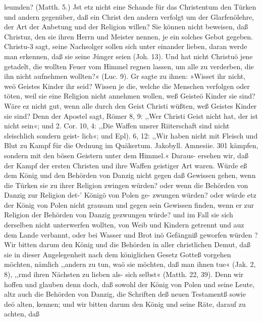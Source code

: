 {    leumden? (Matth. 5.)
    Jst etz nicht eine Schande für das Christentum den Türken
    und andern gegenüber, daß ein Christ den andern verfolgt um
    der Glarfenölehre, der Art der Anbetung und der Religion
    willen? Sie können nicht beweisen, daß Christuz, den sie ihren
    Herrn und Meister nennen, je ein solches Gebot gegeben. Christu-3
    sagt, seine Nachsolger sollen sich unter einander lieben, daran
    werde man erkennen, daß sie seine Jünger seien (Joh. 13). Und
    hat nicht Christuö jene getadelt, die wollten Feuer vom Himmel
    regnen lassen, um alle zu verderben, die ihn nicht aufnehmen
    wollten?« (Luc. 9). Gr sagte zu ihnen: »Wisset ihr nicht, weö
    Geistes Kinder ihr seid? Wissen je die, welche die Menschen
    verfolgen oder töten, weil sie eine Religion nicht annehmen
    wollen, weß Geisteö Kinder sie sind? Wäre ez nicht gut,
    wenn alle durch den Geist Christi wüßten, weß Geistes
    Kinder sie sind? Denn der Apostel sagt, Römer 8, 9: ,,Wer
    Christi Geist nicht hat, der ist nicht sein«; und 2. Cor. 10, 4:
    ,,Die Waffen unsrer Riiterschaft sind nicht sleischlich sondern geist-
    lich«; und Epl). 6, 12: ,,Wir haben nicht mit Fleisch und Blut zu
    Kampf für die Ordnung im Quäkertum. Jakobyll. Amnesiie. 301
    kämpfen, sondern mit den bösen Geistern unter dem Himmel.«
    Daraus- ersehen wir, daß der Kampf der ersten Christen und
    ihre Waffen geistiger Art waren. Würde eß dem König und den
    Behörden von Danzig nicht gegen daß Gewissen gehen, wenn die
    Türken sie zu ihrer Religion zwingen würden? oder wenn die
    Behörden von Danzig zur Religion det-’ Königö von Polen ge-
    zwungen würden? oder würde etz der König von Polen nicht
    grausam und gegen sein Gewissen finden, wenn er zur Religion
    der Behörden von Danzig gezwungen würde? und im Fall sie
    sich derselben nicht unterwerfen wollten, von Weib und Kindern
    getrennt und auz dem Lande verbannt, oder bei Wasser und Brot
    inö Gefängniß geworfen würden ?
    Wir bitten darum den König und die Behörden in aller
    christlichen Demut, daß sie in dieser Angelegenheit nach dem
    königlichen Gesetz Gotteß vorgehen möchten, nämlich ,,andern zu
    tun, waö sie möchten, daß man ihnen tue« (Jak. 2, 8), ,,rmd
    ihren Nächsten zu lieben als- sich selbst« (Matth. 22, 39). Denn
    wir hoffen und glauben denn doch, daß sowohl der König von
    Polen und seine Leute, altz auch die Behörden von Danzig, die
    Schriften deß neuen Testamentß sowie deö alten, kennen; und wir
    bitten darum den König und seine Räte, darauf zu achten, daß
}
